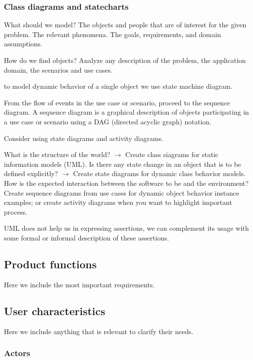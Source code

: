 \subsubsection{Class diagrams and statecharts}
\label{subsubsect:diagrams}

What should we model? The objects and people that are of interest for the given problem. The relevant phenomena. The goals, requirements, and domain assumptions.

How do we find objects? Analyze any description of the problem, the application domain, the scenarios and use cases. 

to model dynamic behavior of a single object we use state machine diagram.

From the flow of events in the use case or scenario, proceed to the sequence diagram. A sequence diagram is a graphical description of objects participating in a use case or scenario using a DAG (directed acyclic graph) notation.

Consider using state diagrams and activity diagrams.

What is the structure of the world? $\rightarrow$ Create class siagrams for static information models (UML). Is there any state change in an object that is to be defined explicitly? $\rightarrow$ Create state diagrams for dynamic class behavior models. How is the expected interaction between the software to be and the environment? Create sequence diagrams from use cases for dynamic object behavior instance examples; or create activity diagrams when you want to highlight important process.

UML does not help us in expressing assertions, we can complement its usage with some formal or informal description of these assertions.

\subsection{Product functions}
\label{subsect:productfunctions}

Here we include the most important requirements.

\subsection{User characteristics}
\label{subsect:usercharacteristics}

Here we include anything that is relevant to clarify their needs.

\subsubsection{Actors}
\label{subsubsect:actors}

